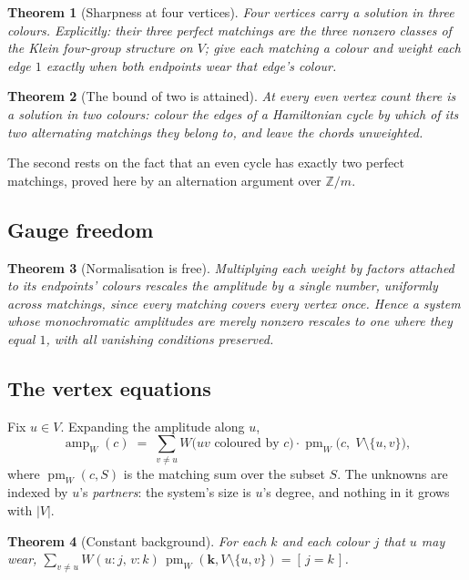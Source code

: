 \documentclass[11pt]{article}
\newtheorem{theorem}{Theorem}[section]
\theoremstyle{definition}
\theoremstyle{remark}
\newcommand{\pmS}{\operatorname{pm}}
\newcommand{\amp}{\operatorname{amp}}
\begin{document}
\begin{theorem}[Sharpness at four vertices]
Four vertices carry a solution in three colours. Explicitly: their three perfect
matchings are the three nonzero classes of the Klein four-group structure on $V$;
give each matching a colour and weight each edge $1$ exactly when both endpoints
wear that edge's colour.
\end{theorem}

\begin{theorem}[The bound of two is attained]
At every even vertex count there is a solution in two colours: colour the edges of a
Hamiltonian cycle by which of its two alternating matchings they belong to, and
leave the chords unweighted.
\end{theorem}

\noindent The second rests on the fact that an even cycle has exactly two perfect
matchings, proved here by an alternation argument over $\mathbb{Z}/m$.

\subsection{Gauge freedom}

\begin{theorem}[Normalisation is free]
Multiplying each weight by factors attached to its endpoints' colours rescales the
amplitude by a single number, uniformly across matchings, since every matching
covers every vertex once. Hence a system whose monochromatic amplitudes are merely
nonzero rescales to one where they equal $1$, with all vanishing conditions
preserved.
\end{theorem}

\subsection{The vertex equations}

Fix $u\in V$. Expanding the amplitude along $u$,
\[
  \amp_W(c)\;=\;\sum_{v\neq u} W\bigl(uv\text{ coloured by }c\bigr)\cdot
  \pmS_W\bigl(c,\;V\setminus\{u,v\}\bigr),
\]
where $\pmS_W(c,S)$ is the matching sum over the subset $S$. The unknowns are
indexed by $u$'s \emph{partners}: the system's size is $u$'s degree, and nothing in
it grows with $|V|$.

\begin{theorem}[Constant background]
For each $k$ and each colour $j$ that $u$ may wear,
$\sum_{v\neq u} W(u{:}j,\,v{:}k)\,\pmS_W(\mathbf{k},V\setminus\{u,v\})
 = [\,j=k\,]$.
\end{theorem}
\end{document}
